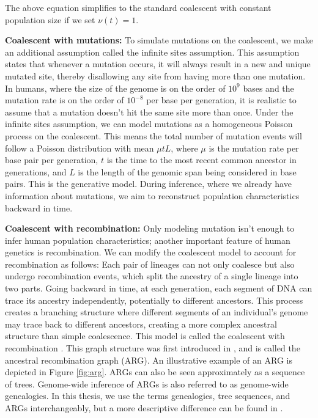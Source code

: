 The above equation simplifies to the standard coalescent with constant population size if we set $\nu(t) = 1$. 


\textbf{Coalescent with mutations:} To simulate mutations on the coalescent, we make an additional assumption called the infinite sites assumption. This assumption states that whenever a mutation occurs, it will always result in a new and unique mutated site, thereby disallowing any site from having more than one mutation. In humans, where the size of the genome is on the order of \(10^9\) bases and the mutation rate is on the order of \(10^{-8}\) per base per generation, it is realistic to assume that a mutation doesn't hit the same site more than once. Under the infinite sites assumption, we can model mutations as a homogeneous Poisson process on the coalescent. This means the total number of mutation events will follow a Poisson distribution with mean \(\mu t L\), where \(\mu\) is the mutation rate per base pair per generation, \(t\) is the time to the most recent common ancestor in generations, and \(L\) is the length of the genomic span being considered in base pairs. This is the generative model. During inference, where we already have information about mutations, we aim to reconstruct population characteristics backward in time.

\textbf{Coalescent with recombination:} Only modeling mutation isn't enough to infer human population characteristics; another important feature of human genetics is recombination. We can modify the coalescent model to account for recombination as follows: Each pair of lineages can not only coalesce but also undergo recombination events, which split the ancestry of a single lineage into two parts. Going backward in time, at each generation, each segment of DNA can trace its ancestry independently, potentially to different ancestors. This process creates a branching structure where different segments of an individual's genome may trace back to different ancestors, creating a more complex ancestral structure than simple coalescence. This model is called the coalescent with recombination \cite{Hudson1983}. This graph structure was first introduced in \cite{Griffiths1997}, and is called the ancestral recombination graph (ARG). An illustrative example of an ARG is depicted in Figure \ref{fig:arg}. ARGs can also be seen approximately as a sequence of trees. Genome-wide inference of ARGs is also referred to as genome-wide genealogies. In this thesis, we use the terms genealogies, tree sequences, and ARGs interchangeably, but a more descriptive difference can be found in \cite{wong2023general}.

